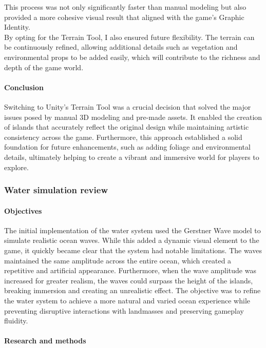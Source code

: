 \documentclass{article}
\begin{document}
This process was not only significantly faster than manual modeling but also provided a more cohesive visual result that aligned with the game's Graphic Identity.\\

By opting for the Terrain Tool, I also ensured future flexibility. The terrain can be continuously refined, allowing additional details such as vegetation and environmental props to be added easily, which will contribute to the richness and depth of the game world.

\paragraph{Conclusion}\hfill

Switching to Unity's Terrain Tool was a crucial decision that solved the major issues posed by manual 3D modeling and pre-made assets. It enabled the creation of islands that accurately reflect the original design while maintaining artistic consistency across the game. Furthermore, this approach established a solid foundation for future enhancements, such as adding foliage and environmental details, ultimately helping to create a vibrant and immersive world for players to explore.



\subsubsection{Water simulation review}
\paragraph{Objectives}\hfill

The initial implementation of the water system used the Gerstner Wave model to simulate realistic ocean waves. While this added a dynamic visual element to the game, it quickly became clear that the system had notable limitations. The waves maintained the same amplitude across the entire ocean, which created a repetitive and artificial appearance. Furthermore, when the wave amplitude was increased for greater realism, the waves could surpass the height of the islands, breaking immersion and creating an unrealistic effect. The objective was to refine the water system to achieve a more natural and varied ocean experience while preventing disruptive interactions with landmasses and preserving gameplay fluidity.

\paragraph{Research and methods}\hfill
\end{document}

